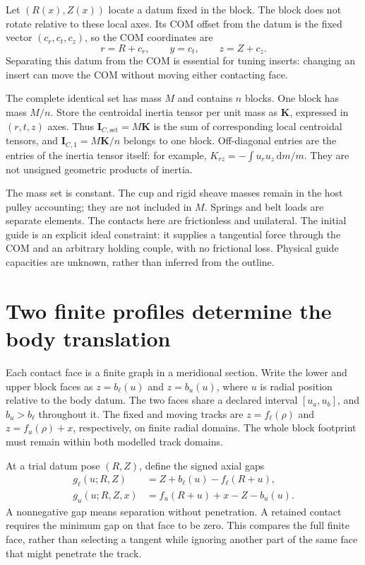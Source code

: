 \documentclass[11pt,letterpaper]{article}
\numberwithin{equation}{section}
\newcommand{\dd}{\mathrm d}
\begin{document}
Let $(R(x),Z(x))$ locate a datum fixed in the block. The block does not rotate
relative to these local axes. Its COM offset from the datum is the fixed
vector $(c_r,c_t,c_z)$, so the COM coordinates are
\begin{equation}
 r=R+c_r,\qquad y=c_t,\qquad z=Z+c_z.
\end{equation}
Separating this datum from the COM is essential for tuning inserts: changing
an insert can move the COM without moving either contacting face.

The complete identical set has mass $M$ and contains $n$ blocks. One block has
mass $M/n$. Store the centroidal inertia tensor per unit mass as $\bm K$,
expressed in $(r,t,z)$ axes. Thus $\bm I_{C,\mathrm{set}}=M\bm K$ is the sum of
corresponding local centroidal tensors, and $\bm I_{C,1}=M\bm K/n$ belongs to
one block. Off-diagonal entries are the entries of the inertia tensor itself:
for example, $K_{rz}=-\int u_r u_z\,\dd m/m$. They are not unsigned geometric
products of inertia.

The mass set is constant. The cup and rigid sheave masses remain in the host
pulley accounting; they are not included in $M$. Springs and belt loads are
separate elements. The contacts here are frictionless and unilateral. The
initial guide is an explicit ideal constraint: it supplies a tangential force
through the COM and an arbitrary holding couple, with no frictional loss.
Physical guide capacities are unknown, rather than inferred from the outline.

\section{Two finite profiles determine the body translation}
\label{sec:contacts}

Each contact face is a finite graph in a meridional section. Write the lower
and upper block faces as $z=b_\ell(u)$ and $z=b_u(u)$, where $u$ is radial
position relative to the body datum. The two faces share a declared interval
$[u_a,u_b]$, and $b_u>b_\ell$ throughout it. The fixed and moving tracks are
$z=f_\ell(\rho)$ and $z=f_u(\rho)+x$, respectively, on finite radial domains.
The whole block footprint must remain within both modelled track domains.

At a trial datum pose $(R,Z)$, define the signed axial gaps
\begin{align}
 g_\ell(u;R,Z)&=Z+b_\ell(u)-f_\ell(R+u),\\
 g_u(u;R,Z,x)&=f_u(R+u)+x-Z-b_u(u).
\end{align}
A nonnegative gap means separation without penetration. A retained contact
requires the minimum gap on that face to be zero. This compares the full
finite face, rather than selecting a tangent while ignoring another part of
the same face that might penetrate the track.
\end{document}
